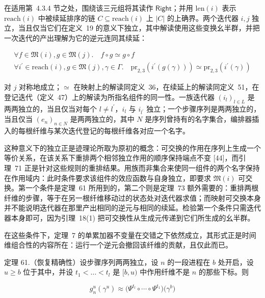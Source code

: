 \documentclass[
  10
]{article}
\begin{document}
在适用第~4.3.4 节之处，围绕该三元组将其读作 \(\mathsf { R i g h t }\)；并用 \(\mathrm { l e n } ( i )\) 表示 \(\mathrm { r e a c h } ( i )\) 中被续延排序的链 \(C \subseteq \mathrm { r e a c h } ( i )\) 上 \(| C |\) 的上确界。两个迭代器 \(i , j\) 独立，当且仅当它们在定义~19 的意义下独立，其中解读使用这些变换幺半群，并把一次迭代的产出理解为它的逆元连同其续延：

\[
\begin{array} { r } { \forall f \in \mathfrak { M } ( i ) , g \in \mathfrak { M } ( j ) . \quad f \circ g \simeq g \circ f \qquad } \\ { \forall i ^ { \prime } \in \mathrm { r e a c h } ( i ) , g \in \mathfrak { M } ( j ) , \gamma \in \Gamma . \quad \mathrm { p r } _ { 2 , 3 } ( i ^ { \prime } ( g ( \gamma ) ) ) \simeq \mathrm { p r } _ { 2 , 3 } ( i ^ { \prime } ( \gamma ) ) } \end{array}\tag{55}
\]

对 \(j\) 对称地成立；\(\simeq\) 在映射上的解读同定义~36，在续延上的解读同定义~51，在登记迭代（定义~47）上的解读为所指名组件的同一性。一族迭代器 \(( i _ { l } ) _ { l \in L }\) 是两两独立的，当且仅当对每个 \({ \mathit { l } } \neq { \mathit { l } } ^ { \prime }\)，\(i _ { l }\) 与 \(i _ { l ^ { \prime } }\) 独立；一个步骤序列是两两独立的，当且仅当 \(( e _ { n } ) _ { n \in N }\) 是两两独立的，其中 \(N\) 是序列曾持有的名字集合，编排器插入的每根纤维与某次迭代登记的每根纤维各对应一个名字。

这种意义下的独立正是迹理论所取为原初的概念：可交换的作用在序列上生成一个等价关系，在该关系下重排两个相邻独立作用的顺序保持端点不变 {[}44{]}，而引理~71 正是针对这些规则的重排结果。用族而非集合来使同一组件的两个名字保持在作用域内：此时条件要求该组件的效应函数与自身独立，即要求 \(\mathfrak { M } ( i )\) 可交换。第一个条件是定理~61 所用到的，第二个则是定理~73 额外需要的：重排两根纤维的步骤，等于在另一根纤维移动过的状态处对迭代器求值；而映射可交换本身并不能说明迭代器在那里产出相同的逆元与相同的续延。检验第一个条件只需迭代器本身即可，因为引理~18(1) 把可交换性从生成元传递到它们所生成的幺半群。

在这些条件下，定理~7 的单累加器不变量在交错之下依然成立，其形式正是时间维组合性的内容所在：运行一个逆元会撤回该纤维的贡献，且仅此而已。

定理 61.（恢复精确性）设步骤序列两两独立，设 \(n\) 的一段进程在 \(b\) 处开启，设 \(u \geq b\) 位于其中，并设 \(t _ { 1 } < \dots < t _ { l }\) 是 \([ b , u )\) 中作用纤维不是 \(n\) 的那些下标。则

\[
g _ { n } ^ { u } ( \gamma ^ { u } ) \approx \big ( \Psi ^ { t _ { l } } \circ \dotsb \circ \Psi ^ { t _ { 1 } } \big ) \big ( \gamma ^ { b } \big )\tag{56}
\]
\end{document}
